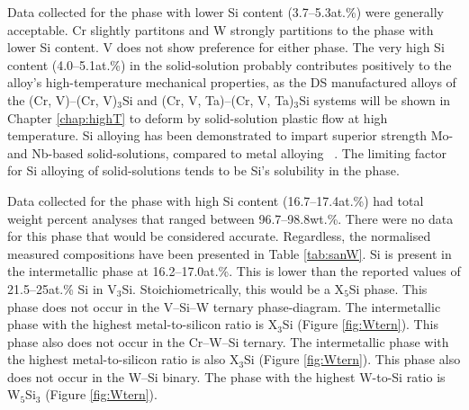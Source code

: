 Data collected for the phase with lower Si content (3.7--5.3at.\%) were generally acceptable.  Cr slightly partitons and W strongly partitions to the phase with lower Si content.  V does not show preference for either phase.  The very high Si content (4.0--5.1at.\%) in the solid-solution probably contributes positively to the alloy's high-temperature mechanical properties, as the DS manufactured alloys of the (Cr, V)--(Cr, V)$_3$Si and (Cr, V, Ta)--(Cr, V, Ta)$_3$Si systems will be shown in Chapter \ref{chap:highT} to deform by solid-solution plastic flow at high temperature.  Si alloying has been demonstrated to impart superior strength Mo- and Nb-based solid-solutions, compared to metal alloying ~\cite{kumar10}.  The limiting factor for Si alloying of solid-solutions tends to be Si's solubility in the phase.  

Data collected for the phase with high Si content (16.7--17.4at.\%) had total weight percent analyses that ranged between 96.7--98.8wt.\%.  There were no data for this phase that would be considered accurate.  Regardless, the normalised measured compositions have been presented in Table \ref{tab:sanW}.  Si is present in the intermetallic phase at 16.2--17.0at.\%.  This is lower than the reported values of 21.5--25at.\% Si in V$_3$Si.  Stoichiometrically, this would be a X$_5$Si phase.  This phase does not occur  in the V--Si--W ternary phase-diagram.  The intermetallic phase with the highest metal-to-silicon ratio is X$_3$Si (Figure \ref{fig:Wtern}).  This phase also does not occur in the Cr--W--Si ternary.  The intermetallic phase with the highest metal-to-silicon ratio is also X$_3$Si (Figure \ref{fig:Wtern}).  This phase also does not occur in the W--Si binary.  The phase with the highest W-to-Si ratio is W$_5$Si$_3$ (Figure \ref{fig:Wtern}).

